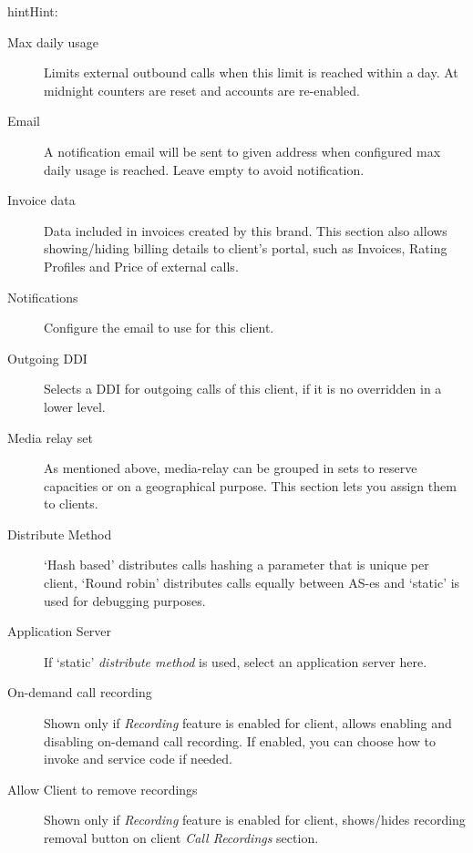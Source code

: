 \documentclass[letterpaper,10pt,english]{sphinxmanual}
\begin{document}
\begin{notice}{hint}{Hint:}
\begin{description}
\item[{Max daily usage}] \leavevmode
Limits external outbound calls when this limit is reached within a day. At midnight counters are reset and
accounts are re-enabled.

\item[{Email}] \leavevmode
A notification email will be sent to given address when configured max daily usage is reached. Leave empty to
avoid notification.

\item[{Invoice data}] \leavevmode
Data included in invoices created by this brand. This section also allows showing/hiding billing details to
client's portal, such as Invoices, Rating Profiles and Price of external calls.

\item[{Notifications}] \leavevmode
Configure the email {\hyperref[administration_portal/brand/settings/notification_templates:id1]{}} to use for this client.

\item[{Outgoing DDI}] \leavevmode
Selects a DDI for outgoing calls of this client, if it is no overridden in
a lower level.

\item[{Media relay set}] \leavevmode
As mentioned above, media-relay can be grouped in sets to reserve capacities
or on a geographical purpose. This section lets you assign them to clients.

\item[{Distribute Method}] \leavevmode
`Hash based' distributes calls hashing a parameter that is unique per
client, `Round robin' distributes calls equally between AS-es and
`static' is used for debugging purposes.

\item[{Application Server}] \leavevmode
If `static' \emph{distribute method} is used, select an application server here.

\item[{On-demand call recording}] \leavevmode
Shown only if \emph{Recording} feature is enabled for client, allows enabling and
disabling on-demand call recording. If enabled, you can choose how to invoke
and service code if needed.

\item[{Allow Client to remove recordings}] \leavevmode
Shown only if \emph{Recording} feature is enabled for client, shows/hides recording
removal button on client \emph{Call Recordings} section.

\end{description}
\end{notice}
\end{document}
